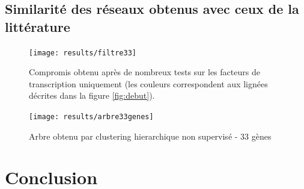 \documentclass[fleqn,11pt]{SelfArx} %
\begin{document}
\subsection{Similarité des réseaux obtenus avec ceux de la littérature}
\begin{figure}[ht]
\centering
\texttt{[image: results/filtre33]}
\caption{Compromis obtenu après de nombreux tests sur les facteurs de transcription uniquement (les couleurs correspondent aux lignées décrites dans la figure \ref{fig:debut}).}
\label{fig:filtre33}
\end{figure}







\begin{figure}[ht]
\centering
\texttt{[image: results/arbre33genes]}
\caption{Arbre obtenu par clustering hierarchique non supervisé - 33 gènes}
\label{fig:arbre33}
\end{figure}



\newpage
\section*{Conclusion}
\end{document}
